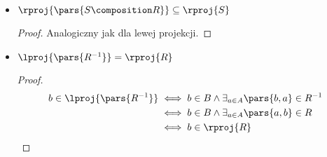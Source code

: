 \begin{description}
\begin{itemize}
\begin{proof}
\begin{equation*}
\begin{split}
                                \implies& a \in A \land \exists_{b \in B} \pars{a, b} \in R\\
                                \iff& a \in \lproj{R}
                        \end{split}
                    \end{equation*}
                    Warto zauważyć, że trzy z~powyższych przejść są tylko implikacjami (bo zapominamy na przykład o~pewnych członach konjunkcji) i~nie jest to przypadek. Istotnie, zachodzi tylko inkluzja w~podaną stronę. Aby się o~tym przekonać możemy przyjąć
                    \begin{align*}
                        A &= \set{a}\\
                        B &= \set{b}\\
                        C &= \set{c}\\
                        R &= \set{\pars{a, b}} \subseteq A \times B\\
                        S &= \emptyset \subseteq B \times C
                    \end{align*}
                    Wtedy \(S \composition R = \emptyset\), zatem również \(\lproj{\pars{S \composition R}} = \emptyset\). Natomiast \(\lproj{R} = \set{a}\), więc istotnie zachodzi dowiedziona inkluzja (byłby przypał, gdyby było inaczej), ale nie ma równości.
                \end{proof}
            \item \(\rproj{\pars{S \composition R}} \subseteq \rproj{S}\)
                \begin{proof}
                    Analogiczny jak dla lewej projekcji.
                \end{proof}
            \item \(\lproj{\pars{R^{-1}}} = \rproj{R}\)
                \begin{proof}
                    \begin{equation*}
                        \begin{split}
                            b \in \lproj{\pars{R^{-1}}}
                                &\iff b \in B \land \exists_{a \in A}\pars{b, a} \in R^{-1}\\
                                &\iff b \in B \land \exists_{a \in A}\pars{a, b} \in R\\
                                &\iff b \in \rproj{R}
                        \end{split}
                    \end{equation*}

\end{proof}
\end{itemize}
\end{description}
